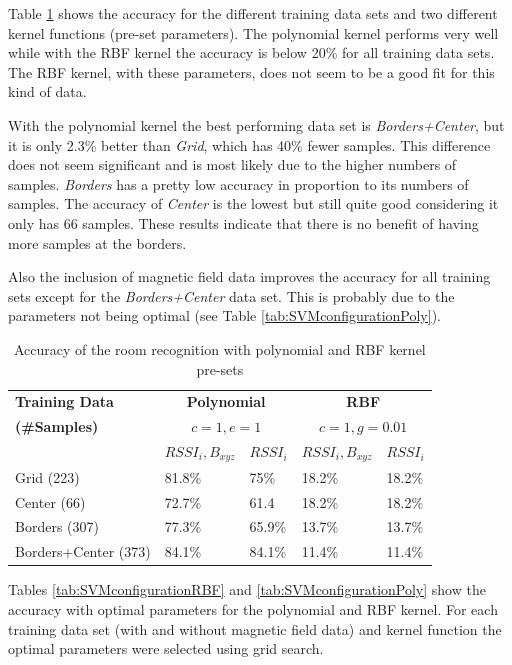 Table \ref{tab:SVMconfigurationPresets} shows the accuracy for the different training data sets and two different kernel functions (pre-set parameters). The polynomial kernel performs very well while with the RBF kernel the accuracy is below 20\% for all training data sets. The RBF kernel, with these parameters, does not seem to be a good fit for this kind of data.

With the polynomial kernel the best performing data set is \emph{Borders+Center}, but it is only 2.3\% better than \emph{Grid}, which has 40\% fewer samples. This difference does not seem significant and is most likely due to the higher numbers of samples. \emph{Borders} has a pretty low accuracy in proportion to its numbers of samples. The accuracy of \emph{Center} is the lowest but still quite good considering it only has 66 samples. These results indicate that there is no benefit of having more samples at the borders.

Also the inclusion of magnetic field data improves the accuracy for all training sets except for the \emph{Borders+Center} data set. This is probably due to the parameters not being optimal (see Table \ref{tab:SVMconfigurationPoly}).

\begin{table}

\centering
\begin{tabular}{l l l l l}
\toprule
\textbf{Training Data}&\multicolumn{2}{c}{\textbf{Polynomial}}&\multicolumn{2}{c}{\textbf{RBF}}\\
\textbf{(\#Samples)}&\multicolumn{2}{c}{$c=1,e=1$}&\multicolumn{2}{c}{$c=1,g=0.01$}\\
&$RSSI_{i},B_{xyz}$&$RSSI_{i}$&$RSSI_{i},B_{xyz}$&$RSSI_{i}$\\
\midrule
Grid (223)&81.8\%&75\%&18.2\%&18.2\%\\
Center (66)&72.7\%&61.4&18.2\%&18.2\%\\
Borders (307)&77.3\%&65.9\%&13.7\%&13.7\%\\
Borders+Center (373)&84.1\%&84.1\%&11.4\%&11.4\%\\
\bottomrule
\end{tabular}
\caption[Room recognition - SVM pre-sets]{Accuracy of the room recognition with polynomial and RBF kernel pre-sets}
\label{tab:SVMconfigurationPresets}
\end{table}

Tables \ref{tab:SVMconfigurationRBF} and \ref{tab:SVMconfigurationPoly} show the accuracy with  optimal parameters for the polynomial and RBF kernel. For each training data set (with and without magnetic field data) and kernel function the optimal parameters were selected using grid search.

